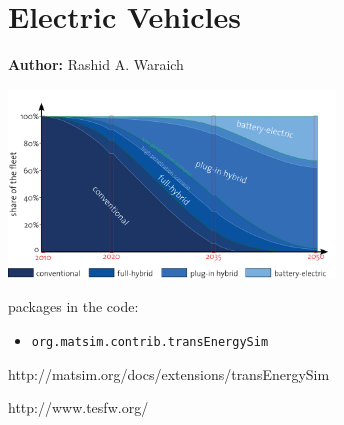 \chapter{Electric Vehicles }
\label{ch:elvehicles}

\hfill \textbf{Author:} Rashid A. Waraich

\begin{center} \includegraphics[width=0.65\textwidth, angle=0]{extending/figures/Elvehicles/main.png} \end{center}


\citet[][]{WaraichEtAl_TRR_2013, GalusEtAl_STRC_2009, WaraichEtAl_IATBR_2009, GalusEtAl_ITSG_2012, Waraich_PhDThesis_2014, AbedinWaraich_TechRep_IVT_2013, WaraichEtAl_TechRep_IVT_2013, GalusEtAl_ResRep_EWZ_2012, Waraich_unpub_EURO_2012, Waraich_unpub_MATSimUserMeeting_2012, WaraichEtAl_JanssensEtAl_2014, WaraichAxhausen_SDEWES_2013}

packages in the code:
\begin{itemize}
	\item \lstinline|org.matsim.contrib.transEnergySim|
\end{itemize}

http://matsim.org/docs/extensions/transEnergySim

http://www.tesfw.org/


